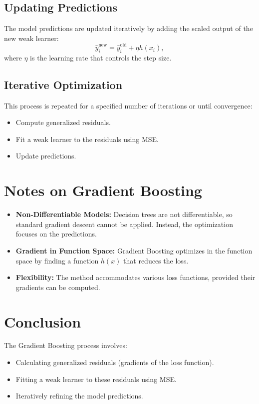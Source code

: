\documentclass[12pt]{article}
\begin{document}
\subsection*{Updating Predictions}
The model predictions are updated iteratively by adding the scaled output of the new weak learner:
\[
\hat{y}_i^{\text{new}} = \hat{y}_i^{\text{old}} + \eta h(x_i),
\]
where \( \eta \) is the learning rate that controls the step size.

\subsection*{Iterative Optimization}
This process is repeated for a specified number of iterations or until convergence:
\begin{itemize}
    \item Compute generalized residuals.
    \item Fit a weak learner to the residuals using MSE.
    \item Update predictions.
\end{itemize}

\section*{Notes on Gradient Boosting}
\begin{itemize}
    \item \textbf{Non-Differentiable Models:} Decision trees are not differentiable, so standard gradient descent cannot be applied. Instead, the optimization focuses on the predictions.
    \item \textbf{Gradient in Function Space:} Gradient Boosting optimizes in the function space by finding a function \( h(x) \) that reduces the loss.
    \item \textbf{Flexibility:} The method accommodates various loss functions, provided their gradients can be computed.
\end{itemize}

\section*{Conclusion}
The Gradient Boosting process involves:
\begin{itemize}
    \item Calculating generalized residuals (gradients of the loss function).
    \item Fitting a weak learner to these residuals using MSE.
    \item Iteratively refining the model predictions.
\end{itemize}
\end{document}
